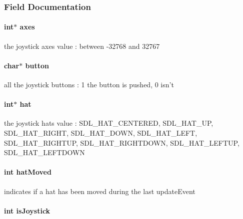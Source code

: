 \subsubsection{Field Documentation}
\hypertarget{struct_input_ae2fe71f7c5edeaa9fc2676be4a93499a}{
\paragraph[{axes}]{\setlength{\rightskip}{0pt plus 5cm}int$\ast$ axes}}\label{struct_input_ae2fe71f7c5edeaa9fc2676be4a93499a}
the joystick axes value \-: between -\/32768 and 32767 \hypertarget{struct_input_a7f901d4dc1179ea534cb9e5cce0a260b}{
\paragraph[{button}]{\setlength{\rightskip}{0pt plus 5cm}char$\ast$ button}}\label{struct_input_a7f901d4dc1179ea534cb9e5cce0a260b}
all the joystick buttons \-: 1 the button is pushed, 0 isn't \hypertarget{struct_input_ab1c8c264ad7cfee584093b1479c03f75}{
\paragraph[{hat}]{\setlength{\rightskip}{0pt plus 5cm}int$\ast$ hat}}\label{struct_input_ab1c8c264ad7cfee584093b1479c03f75}
the joystick hats value \-: S\-D\-L\-\_\-\-H\-A\-T\-\_\-\-C\-E\-N\-T\-E\-R\-E\-D, S\-D\-L\-\_\-\-H\-A\-T\-\_\-\-U\-P, S\-D\-L\-\_\-\-H\-A\-T\-\_\-\-R\-I\-G\-H\-T, S\-D\-L\-\_\-\-H\-A\-T\-\_\-\-D\-O\-W\-N, S\-D\-L\-\_\-\-H\-A\-T\-\_\-\-L\-E\-F\-T, S\-D\-L\-\_\-\-H\-A\-T\-\_\-\-R\-I\-G\-H\-T\-U\-P, S\-D\-L\-\_\-\-H\-A\-T\-\_\-\-R\-I\-G\-H\-T\-D\-O\-W\-N, S\-D\-L\-\_\-\-H\-A\-T\-\_\-\-L\-E\-F\-T\-U\-P, S\-D\-L\-\_\-\-H\-A\-T\-\_\-\-L\-E\-F\-T\-D\-O\-W\-N \hypertarget{struct_input_af7cf3c53ae2105eec18ce989dd3ddae0}{
\paragraph[{hat\-Moved}]{\setlength{\rightskip}{0pt plus 5cm}int hat\-Moved}}\label{struct_input_af7cf3c53ae2105eec18ce989dd3ddae0}
indicates if a hat has been moved during the last update\-Event \hypertarget{struct_input_a163e08d0d19093f658f448710f8e3c49}{
\paragraph[{is\-Joystick}]{\setlength{\rightskip}{0pt plus 5cm}int is\-Joystick}}\label{struct_input_a163e08d0d19093f658f448710f8e3c49}
